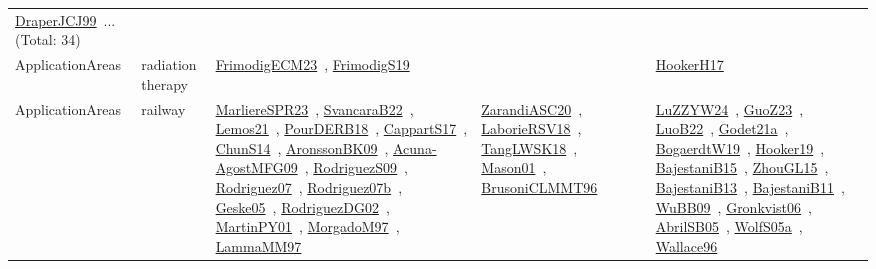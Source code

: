 {\begin{longtable}{lp{3cm}>{\raggedright\arraybackslash}p{6cm}>{\raggedright\arraybackslash}p{6cm}>{\raggedright\arraybackslash}p{8cm}}
\href{../works/DraperJCJ99.pdf}{DraperJCJ99}~\cite{DraperJCJ99}... (Total: 34)\\
\index{radiation therapy}\index{ApplicationAreas!radiation therapy}ApplicationAreas & radiation therapy & \href{../works/FrimodigECM23.pdf}{FrimodigECM23}~\cite{FrimodigECM23}, \href{../works/FrimodigS19.pdf}{FrimodigS19}~\cite{FrimodigS19} &  & \href{../works/HookerH17.pdf}{HookerH17}~\cite{HookerH17}\\
\index{railway}\index{ApplicationAreas!railway}ApplicationAreas & railway & \href{../works/MarliereSPR23.pdf}{MarliereSPR23}~\cite{MarliereSPR23}, \href{../works/SvancaraB22.pdf}{SvancaraB22}~\cite{SvancaraB22}, \href{../works/Lemos21.pdf}{Lemos21}~\cite{Lemos21}, \href{../works/PourDERB18.pdf}{PourDERB18}~\cite{PourDERB18}, \href{../works/CappartS17.pdf}{CappartS17}~\cite{CappartS17}, \href{../works/ChunS14.pdf}{ChunS14}~\cite{ChunS14}, \href{../works/AronssonBK09.pdf}{AronssonBK09}~\cite{AronssonBK09}, \href{../works/Acuna-AgostMFG09.pdf}{Acuna-AgostMFG09}~\cite{Acuna-AgostMFG09}, \href{../works/RodriguezS09.pdf}{RodriguezS09}~\cite{RodriguezS09}, \href{../works/Rodriguez07.pdf}{Rodriguez07}~\cite{Rodriguez07}, \href{../works/Rodriguez07b.pdf}{Rodriguez07b}~\cite{Rodriguez07b}, \href{../works/Geske05.pdf}{Geske05}~\cite{Geske05}, \href{../works/RodriguezDG02.pdf}{RodriguezDG02}~\cite{RodriguezDG02}, \href{../works/MartinPY01.pdf}{MartinPY01}~\cite{MartinPY01}, \href{../works/MorgadoM97.pdf}{MorgadoM97}~\cite{MorgadoM97}, \href{../works/LammaMM97.pdf}{LammaMM97}~\cite{LammaMM97} & \href{../works/ZarandiASC20.pdf}{ZarandiASC20}~\cite{ZarandiASC20}, \href{../works/LaborieRSV18.pdf}{LaborieRSV18}~\cite{LaborieRSV18}, \href{../works/TangLWSK18.pdf}{TangLWSK18}~\cite{TangLWSK18}, \href{../works/Mason01.pdf}{Mason01}~\cite{Mason01}, \href{../works/BrusoniCLMMT96.pdf}{BrusoniCLMMT96}~\cite{BrusoniCLMMT96} & \href{../works/LuZZYW24.pdf}{LuZZYW24}~\cite{LuZZYW24}, \href{../works/GuoZ23.pdf}{GuoZ23}~\cite{GuoZ23}, \href{../works/LuoB22.pdf}{LuoB22}~\cite{LuoB22}, \href{../works/Godet21a.pdf}{Godet21a}~\cite{Godet21a}, \href{../works/BogaerdtW19.pdf}{BogaerdtW19}~\cite{BogaerdtW19}, \href{../works/Hooker19.pdf}{Hooker19}~\cite{Hooker19}, \href{../works/BajestaniB15.pdf}{BajestaniB15}~\cite{BajestaniB15}, \href{../works/ZhouGL15.pdf}{ZhouGL15}~\cite{ZhouGL15}, \href{../works/BajestaniB13.pdf}{BajestaniB13}~\cite{BajestaniB13}, \href{../works/BajestaniB11.pdf}{BajestaniB11}~\cite{BajestaniB11}, \href{../works/WuBB09.pdf}{WuBB09}~\cite{WuBB09}, \href{../works/Gronkvist06.pdf}{Gronkvist06}~\cite{Gronkvist06}, \href{../works/AbrilSB05.pdf}{AbrilSB05}~\cite{AbrilSB05}, \href{../works/WolfS05a.pdf}{WolfS05a}~\cite{WolfS05a}, \href{../works/Wallace96.pdf}{Wallace96}~\cite{Wallace96}\\

\end{longtable}}
